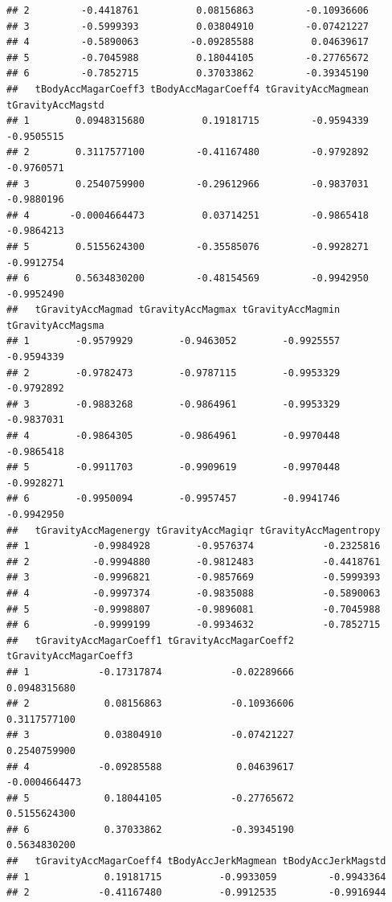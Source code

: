 \documentclass[
]{article}
\begin{document}
\begin{verbatim}
## 2         -0.4418761          0.08156863         -0.10936606
## 3         -0.5999393          0.03804910         -0.07421227
## 4         -0.5890063         -0.09285588          0.04639617
## 5         -0.7045988          0.18044105         -0.27765672
## 6         -0.7852715          0.37033862         -0.39345190
##   tBodyAccMagarCoeff3 tBodyAccMagarCoeff4 tGravityAccMagmean tGravityAccMagstd
## 1        0.0948315680          0.19181715         -0.9594339        -0.9505515
## 2        0.3117577100         -0.41167480         -0.9792892        -0.9760571
## 3        0.2540759900         -0.29612966         -0.9837031        -0.9880196
## 4       -0.0004664473          0.03714251         -0.9865418        -0.9864213
## 5        0.5155624300         -0.35585076         -0.9928271        -0.9912754
## 6        0.5634830200         -0.48154569         -0.9942950        -0.9952490
##   tGravityAccMagmad tGravityAccMagmax tGravityAccMagmin tGravityAccMagsma
## 1        -0.9579929        -0.9463052        -0.9925557        -0.9594339
## 2        -0.9782473        -0.9787115        -0.9953329        -0.9792892
## 3        -0.9883268        -0.9864961        -0.9953329        -0.9837031
## 4        -0.9864305        -0.9864961        -0.9970448        -0.9865418
## 5        -0.9911703        -0.9909619        -0.9970448        -0.9928271
## 6        -0.9950094        -0.9957457        -0.9941746        -0.9942950
##   tGravityAccMagenergy tGravityAccMagiqr tGravityAccMagentropy
## 1           -0.9984928        -0.9576374            -0.2325816
## 2           -0.9994880        -0.9812483            -0.4418761
## 3           -0.9996821        -0.9857669            -0.5999393
## 4           -0.9997374        -0.9835088            -0.5890063
## 5           -0.9998807        -0.9896081            -0.7045988
## 6           -0.9999199        -0.9934632            -0.7852715
##   tGravityAccMagarCoeff1 tGravityAccMagarCoeff2 tGravityAccMagarCoeff3
## 1            -0.17317874            -0.02289666           0.0948315680
## 2             0.08156863            -0.10936606           0.3117577100
## 3             0.03804910            -0.07421227           0.2540759900
## 4            -0.09285588             0.04639617          -0.0004664473
## 5             0.18044105            -0.27765672           0.5155624300
## 6             0.37033862            -0.39345190           0.5634830200
##   tGravityAccMagarCoeff4 tBodyAccJerkMagmean tBodyAccJerkMagstd
## 1             0.19181715          -0.9933059         -0.9943364
## 2            -0.41167480          -0.9912535         -0.9916944

\end{verbatim}
\end{document}
